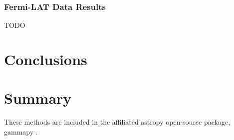 \documentclass{PoS}
\begin{document}
\subsubsection{Fermi-LAT Data Results}

TODO

\section{Conclusions}


\section{Summary}
These methods are included in the affiliated astropy open-source package, gammapy \cite{Deil}.

\begin{thebibliography}{99}





\end{thebibliography}
\end{document}
